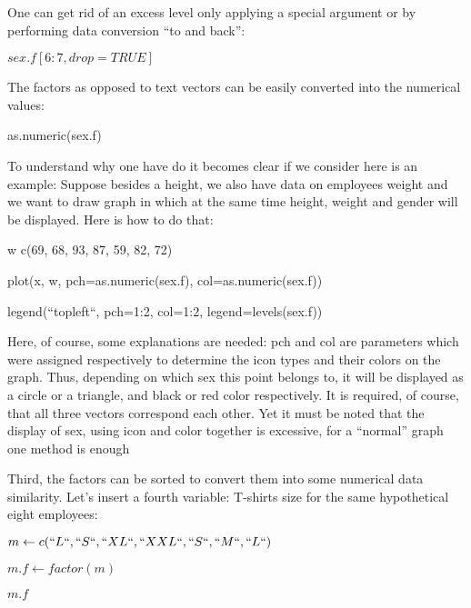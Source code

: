 \documentclass{beamer}
\begin{document}
\begin{frame}{}
One can get rid of an excess level only applying a special argument or by performing data conversion “to and back”:
\begin{center}

$sex.f[6:7, drop=TRUE]$

\end{center}
\end{frame}

\begin{frame}{}
The factors as opposed to text vectors can be easily converted into the numerical values:
\begin{center}
as.numeric(sex.f)
\end{center}
\end{frame}


\begin{frame}{}

To understand why one have do it becomes clear if we consider here is an example: Suppose besides a height, we also have data on employees weight and we want to draw graph in which at the same time height, weight and gender will be displayed. Here is how to do that:
\begin{center}

w \leftarrow c(69, 68, 93, 87, 59, 82, 72)

plot(x, w, pch=as.numeric(sex.f), col=as.numeric(sex.f))

legend(``topleft``, pch=1:2, col=1:2, legend=levels(sex.f))

\end{center}

\end{frame}

\begin{frame}{}
Here, of course, some explanations are needed: pch and col are parameters which were assigned respectively to determine the icon types and their colors on the graph. Thus, depending on which sex this point belongs to, it will be displayed as a circle or a triangle, and black or red color respectively. It is required, of course, that all three vectors correspond each other. Yet it must be noted that the display of sex, using icon and color together is excessive, for a “normal” graph one method is enough
\end{frame}

\begin{frame}{}
Third, the factors can be sorted to convert them into some numerical data similarity. Let’s insert a fourth variable: T-shirts size for the same hypothetical eight employees:
\begin{center}

$m \leftarrow c(``L``,``S``, ``XL``, ``XXL``, ``S``, ``M``, ``L``)$

$m.f \leftarrow factor(m)$

$m.f$

\end{center}
\end{frame}
\end{document}
